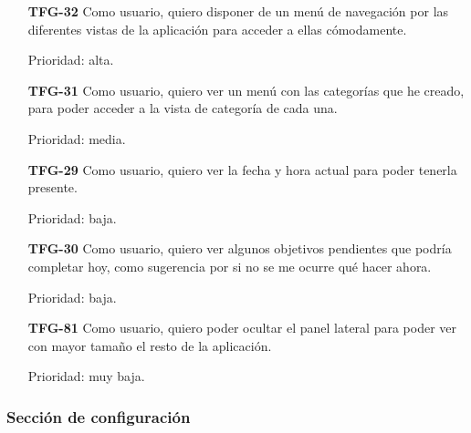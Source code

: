 \documentclass[10pt, a4paper]{aqademic}
\begin{document}
\begin{itemize}[leftmargin=16mm]
	\item [\textbf{TFG-32}] Como usuario, quiero disponer de un menú de navegación por las diferentes vistas de la aplicación para acceder a ellas cómodamente.
	
	Prioridad: alta.
	
	\item [\textbf{TFG-31}] Como usuario, quiero ver un menú con las categorías que he creado, para poder acceder a la vista de categoría de cada una.
	
	Prioridad: media.
	
	\item [\textbf{TFG-29}] Como usuario, quiero ver la fecha y hora actual para poder tenerla presente.
	
	Prioridad: baja.
	
	\item [\textbf{TFG-30}] Como usuario, quiero ver algunos objetivos pendientes que podría completar hoy, como sugerencia por si no se me ocurre qué hacer ahora.
	
	Prioridad: baja.
	
	\item [\textbf{TFG-81}] Como usuario, quiero poder ocultar el panel lateral para poder ver con mayor tamaño el resto de la aplicación.
	
	Prioridad: muy baja.
\end{itemize}

\subsubsection*{Sección de configuración}
\end{document}
